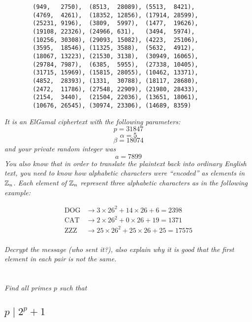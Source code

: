 \documentclass[12pt]{article}
\begin{document}
    \begin{verbatim}
        (949,   2750),  (8513,  28089), (5513,  8421),
        (4769,  4261),  (18352, 12856), (17914, 28599),
        (25231, 9196),  (3809,  5997),  (1477,  19626),
        (19108, 22326), (24966, 631),   (3494,  5974),
        (10256, 30308), (29093, 15082), (4223,  25106),
        (3595,  18546), (11325, 3588),  (5632,  4912),
        (18067, 13223), (21530, 3138),  (30949, 16065),
        (29784, 7987),  (6385,  5955),  (27338, 10405),
        (31715, 15969), (15815, 28055), (10462, 13371),
        (4852,  28393), (1331,  30788), (18117, 28680),
        (2472,  11786), (27548, 22909), (21980, 28433),
        (2154,  3440),  (21504, 22036), (13651, 18061),
        (10676, 26545), (30974, 23306), (14689, 8359)
    \end{verbatim}

\textit{It is an ElGamal ciphertext with the following parameters:}
    $$p = 31847$$
    $$\alpha = 5$$
    $$\beta = 18074$$
\textit{and your private random integer was}
    $$a = 7899$$
\textit{You also know that in order to translate the plaintext back into ordinary English text, you need to know how alphabetic characters were ``encoded'' as elements in $\mathbb{Z}_n$.  Each element of $\mathbb{Z}_n$ represent three alphabetic characters as in the following example:}

    \begin{align*}
        \text{DOG} &\to 3  \times 26^2 + 14 \times 26 + 6  = 2398\\
        \text{CAT} &\to 2  \times 26^2 + 0  \times 26 + 19 = 1371\\
        \text{ZZZ} &\to 25 \times 26^2 + 25 \times 26 + 25 = 17575\\
    \end{align*}

\textit{Decrypt the message (who sent it?), also explain why it is good that the first element in each pair is not the same.}

\newpage

\section{} \textit{Find all primes $p$ such that}

    \subsection{$p \mid 2^p + 1$}
\end{document}
